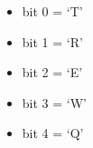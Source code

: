 \begin{itemize}
\item[] bit 0 = ‘T’
\item[] bit 1 = ‘R’
\item[] bit 2 = ‘E’
\item[] bit 3 = ‘W’
\item[] bit 4 = ‘Q’
\end{itemize}

